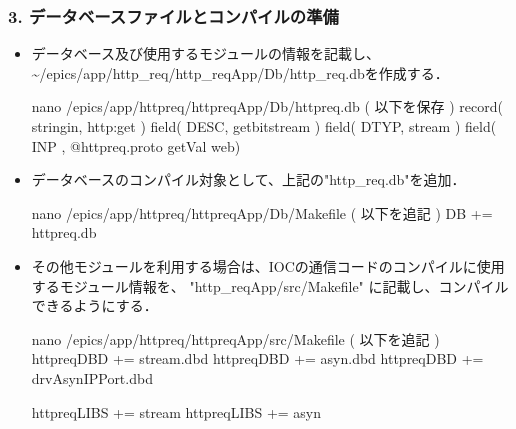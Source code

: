 \documentclass[letterpaper,10pt,dvipdfmx]{sphinxmanual}
\begin{document}
\subsubsection{3. データベースファイルとコンパイルの準備}
\label{\detokenize{epics/rst/example1__httpRequest_to_Google:id5}}\begin{itemize}
\item {} 
データベース及び使用するモジュールの情報を記載し、\textasciitilde{}/epics/app/http\_req/http\_reqApp/Db/http\_req.dbを作成する．

\begin{sphinxVerbatim}[commandchars=\\\{\}]
\PYGZdl{} nano \PYGZti{}/epics/app/http\PYGZus{}req/http\PYGZus{}reqApp/Db/http\PYGZus{}req.db
( 以下を保存 )
record( stringin, \PYGZdq{}http:get\PYGZdq{} )
\PYGZob{}
field( DESC, \PYGZdq{}getbitstream\PYGZdq{} )
field( DTYP, \PYGZdq{}stream\PYGZdq{} )
field( INP , \PYGZdq{}@http\PYGZus{}req.proto getVal web\PYGZdq{})
\PYGZcb{}
\end{sphinxVerbatim}

\item {} 
データベースのコンパイル対象として、上記の"http\_req.db"を追加．

\begin{sphinxVerbatim}[commandchars=\\\{\}]
\PYGZdl{} nano \PYGZti{}/epics/app/http\PYGZus{}req/http\PYGZus{}reqApp/Db/Makefile
( 以下を追記 )
DB += http\PYGZus{}req.db
\end{sphinxVerbatim}

\item {} 
その他モジュールを利用する場合は、IOCの通信コードのコンパイルに使用するモジュール情報を、 "http\_reqApp/src/Makefile" に記載し、コンパイルできるようにする．

\begin{sphinxVerbatim}[commandchars=\\\{\}]
\PYGZdl{} nano \PYGZti{}/epics/app/http\PYGZus{}req/http\PYGZus{}reqApp/src/Makefile
( 以下を追記 )
http\PYGZus{}req\PYGZus{}DBD  += stream.dbd
http\PYGZus{}req\PYGZus{}DBD  += asyn.dbd
http\PYGZus{}req\PYGZus{}DBD  += drvAsynIPPort.dbd

http\PYGZus{}req\PYGZus{}LIBS += stream
http\PYGZus{}req\PYGZus{}LIBS += asyn
\end{sphinxVerbatim}

\end{itemize}
\end{document}
